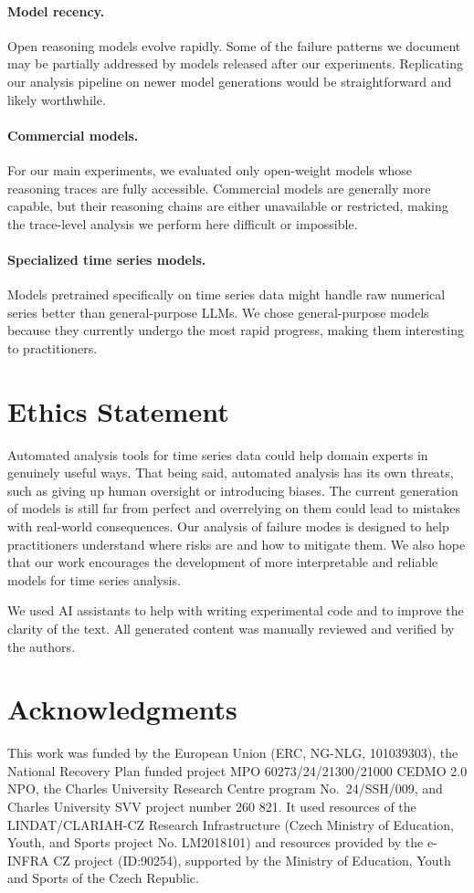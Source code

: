 \documentclass[11pt]{article}
\begin{document}
\paragraph{Model recency.}
Open reasoning models evolve rapidly. Some of the failure patterns we document may be partially addressed by models released after our experiments. Replicating our analysis pipeline on newer model generations would be straightforward and likely worthwhile.

\paragraph{Commercial models.}
For our main experiments, we evaluated only open-weight models whose reasoning traces are fully accessible. Commercial models are generally more capable, but their reasoning chains are either unavailable or restricted, making the trace-level analysis we perform here difficult or impossible.

\paragraph{Specialized time series models.}
Models pretrained specifically on time series data might handle raw numerical series better than general-purpose LLMs. We chose general-purpose models because they currently undergo the most rapid progress, making them interesting to practitioners.


\section*{Ethics Statement}

Automated analysis tools for time series data could help domain experts in genuinely useful ways. That being said, automated analysis has its own threats, such as giving up human oversight or introducing biases. The current generation of models is still far from perfect and overrelying on them could lead to mistakes with real-world consequences. Our analysis of failure modes is designed to help practitioners understand where risks are and how to mitigate them. We also hope that our work encourages the development of more interpretable and reliable models for time series analysis.

We used AI assistants to help with writing experimental code and to improve the clarity of the text. All generated content was manually reviewed and verified by the authors.

\section*{Acknowledgments}
This work was funded by the European Union (ERC, NG-NLG, 101039303), the National Recovery Plan funded project MPO 60273/24/21300/21000 CEDMO 2.0 NPO, the Charles University Research Centre program No.~24/SSH/009, and Charles University SVV project number 260 821. It used resources of the LINDAT/CLARIAH-CZ Research Infrastructure (Czech Ministry of Education, Youth, and Sports project No. LM2018101) and resources provided by the e-INFRA CZ project (ID:90254), supported by the Ministry of Education, Youth and Sports of the Czech Republic.
\end{document}
